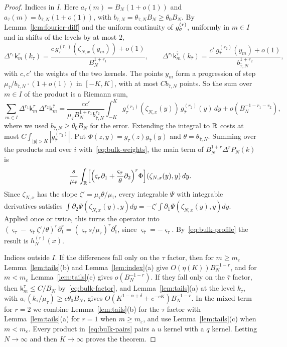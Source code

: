 \begin{proof}
Indices in $I$. Here $a_\tau(m)=B_N(1+o(1))$ and $a_{\bar\tau}(m)=b_{\bar\tau,N}(1+o(1))$, with
$b_{\bar\tau,N}=\theta_{\bar\tau,N}B_N\ge\theta_0B_N$. By Lemma~\ref{lem:fourier-diff} and the
uniform continuity of $g^{(r)}_\sigma$, uniformly in $m\in I$ and in shifts of the levels by at most
$2$,
\[
 \Delta^{r_1}\mathsf k^\tau_m(k_\tau)=\frac{c\,g^{(r_1)}_\tau(\zeta_{N,x}(y_m))+o(1)}{B_N^{1+r_1}},\qquad
 \Delta^{r_2}\mathsf k^{\bar\tau}_m(k_{\bar\tau})=\frac{c'\,g^{(r_2)}_{\bar\tau}(y_m)+o(1)}{b_{\bar\tau,N}^{1+r_2}},
\]
with $c,c'$ the weights of the two kernels. The points $y_m$ form a progression of step
$\mu_{\bar\tau}/b_{\bar\tau,N}\cdot(1+o(1))$ in $[-K,K]$, with at most $Cb_{\bar\tau,N}$ points. So the
sum over $m\in I$ of the product is a Riemann sum,
\[
 \sum_{m\in I}\Delta^{r_1}\mathsf k^\tau_m\,\Delta^{r_2}\mathsf k^{\bar\tau}_m
 =\frac{cc'}{\mu_{\bar\tau}B_N^{1+r_1}b_{\bar\tau,N}^{r_2}}\int_{-K}^K g^{(r_1)}_\tau(\zeta_{N,x}(y))\,g^{(r_2)}_{\bar\tau}(y)\,dy
 +o(B_N^{-1-r_1-r_2}),
\]
where we used $b_{\bar\tau,N}\ge\theta_0B_N$ for the error. Extending the integral to $\mathbb{R}$ costs at
most $C\int_{|y|>K}|g^{(r_2)}_{\bar\tau}|$. Put $\Phi(z,y)=g_\tau(z)g_{\bar\tau}(y)$ and
$\theta=\theta_{\bar\tau,N}$. Summing over the products and over $i$ with~\eqref{eq:bulk-weights},
the main term of $B_N^{1+r}\Delta^rP_N(k)$ is
\[
 \frac s{\mu_{\bar\tau}}\int_{\mathbb{R}}\Bigl[\Bigl(\varsigma_\tau\partial_1+\frac{\varsigma_{\bar\tau}}\theta\partial_2\Bigr)^r\Phi\Bigr](\zeta_{N,x}(y),y)\,dy .
\]
Since $\zeta_{N,x}$ has the slope $\zeta'=\mu_\tau\theta/\mu_{\bar\tau}$, every integrable $\Psi$
with integrable derivatives satisfies $\int\partial_2\Psi(\zeta_{N,x}(y),y)dy=-\zeta'\int\partial_1\Psi(\zeta_{N,x}(y),y)dy$.
Applied once or twice, this turns the operator into
$(\varsigma_\tau-\varsigma_{\bar\tau}\zeta'/\theta)^r\partial_1^r=(\varsigma_\tau s/\mu_{\bar\tau})^r\partial_1^r$,
since $\varsigma_{\bar\tau}=-\varsigma_\tau$. By~\eqref{eq:bulk-profile} the result is
$h^{(r)}_N(x)$.

Indices outside $I$. If the differences fall only on the $\tau$ factor, then for
$m\ge m_\varepsilon$ Lemma~\ref{lem:tails}(b) and Lemma~\ref{lem:index}(a) give
$O(\eta(K))B_N^{-1-r}$, and for $m<m_\varepsilon$ Lemma~\ref{lem:tails}(c) gives $o(B_N^{-1-r})$.
If they fall only on the $\bar\tau$ factor, then $\mathsf k^\tau_m\le C/B_N$
by~\eqref{eq:bulk-factor}, and Lemma~\ref{lem:tails}(a) at the level $k_{\bar\tau}$, with
$a_{\bar\tau}(k_{\bar\tau}/\mu_{\bar\tau})\ge c\theta_0B_N$, gives $O(K^{1-\alpha+\delta}+e^{-cK})B_N^{-1-r}$.
In the mixed term for $r=2$ we combine Lemma~\ref{lem:tails}(b) for the $\tau$ factor with
Lemma~\ref{lem:tails}(a) for $r=1$ when $m\ge m_\varepsilon$, and use Lemma~\ref{lem:tails}(c)
when $m<m_\varepsilon$. Every product in~\eqref{eq:bulk-pairs} pairs a $u$ kernel with a $q$
kernel. Letting $N\to\infty$ and then $K\to\infty$ proves the theorem.
\end{proof}

